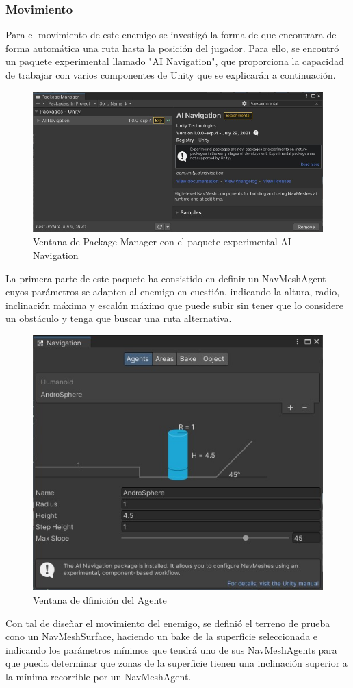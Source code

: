 \documentclass[12pt,spanish]{article}
\begin{document}
\subsubsection{Movimiento}

    Para el movimiento de este enemigo se investigó la forma de que encontrara  de forma automática una ruta hasta la posición del jugador. Para ello, se encontró un paquete experimental llamado "AI Navigation", que proporciona la capacidad de trabajar con varios componentes de Unity que se explicarán a continuación.

\begin{figure}[h!]
 \centering
 \includegraphics[width = 0.6\linewidth]{enemies/AndroSphere/AINavigation.jpg}
 \caption{Ventana de Package Manager con el paquete experimental AI Navigation}
 \label{fig:t2}
\end{figure}

    La primera parte de este paquete ha consistido en definir un NavMeshAgent cuyos parámetros se adapten al enemigo en cuestión, indicando la altura, radio, inclinación máxima y escalón máximo que puede subir sin tener que lo considere un obstáculo y tenga que buscar una ruta alternativa.

\begin{figure}[h!]
 \centering
 \includegraphics[width = 0.45\linewidth]{enemies/AndroSphere/AndroSphere_NavigationAgent.jpg}
 \caption{Ventana de dfinición del Agente}
 \label{fig:t2}
\end{figure}

\newpage
    
    Con tal de diseñar el movimiento del enemigo, se definió el terreno de prueba cono un NavMeshSurface, haciendo un bake de la superficie seleccionada e indicando los parámetros mínimos que tendrá uno de sus NavMeshAgents para que pueda determinar que zonas de la superficie tienen una inclinación superior a la mínima recorrible por un NavMeshAgent.
\end{document}
